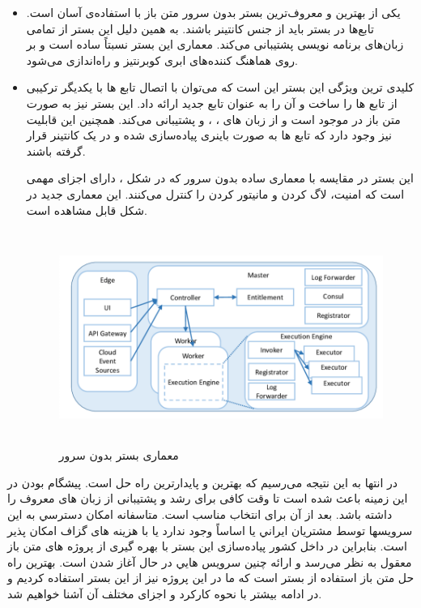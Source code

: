 \begin{itemize}
	\item \textbf{} یکی از بهترین و معروف‌ترین بستر بدون سرور متن باز با استفاده‌ی آسان است. تابع‌ها در بستر  باید از جنس کانتینر باشند. به همین دلیل این بستر از تمامی زبان‌های برنامه نویسی پشتیبانی می‌کند. معماری این بستر نسبتاً ساده است و بر روی هماهنگ کننده‌های ابری کوبرنتیز و  راه‌اندازی می‌شود.
	\cite{openfaas}
	
	\item \textbf{}  کلیدی ترین ویژگی این بستر این است که می‌توان با اتصال تابع ها با یکدیگر ترکیبی از تابع ها را ساخت و آن را به عنوان تابع جدید ارائه داد. این بستر نیز به صورت متن باز در  موجود است و از زبان های ، ،  و  پشتیبانی می‌کند. همچنین این قابلیت نیز وجود دارد که تابع ها به صورت باینری پیاده‌سازی شده و در یک کانتینر قرار گرفته باشند.
	
	این بستر در مقایسه با معماری ساده بدون سرور که در شکل ، دارای اجزای مهمی است که امنیت، لاگ کردن و مانیتور کردن را کنترل می‌کنند. این معماری جدید در شکل قابل مشاهده است.
	
	\begin{figure}[!h]
		\centering
		\includegraphics[height=7cm]{images/OpenWhisk-architecture}
		\caption{معماری بستر بدون سرور }
		\label{تصویر 2-1}
	\end{figure}
	
\end{itemize}

در انتها به این نتیجه می‌رسیم که بهترین و پایدارترین راه حل  است. پیشگام بودن در این زمینه باعث شده است تا وقت کافی برای رشد و پشتیبانی از زبان های معروف را داشته باشد. بعد از آن  برای انتخاب مناسب است. متاسفانه امكان دسترسي به اين سرويسها توسط مشتريان ايراني يا اساساً وجود ندارد يا با هزينه های گزاف امكان پذير است. بنابراین در داخل کشور پیاده‌سازی این بستر با بهره گیری از پروژه های متن باز معقول به نظر می‌رسد و ارائه چنين سرويس هايي در حال آغاز شدن است. بهترین راه حل متن باز استفاده از بستر  است که ما در این پروژه نیز از این بستر استفاده کردیم و در ادامه بیشتر با نحوه کارکرد و اجزای مختلف آن آشنا خواهیم شد.

